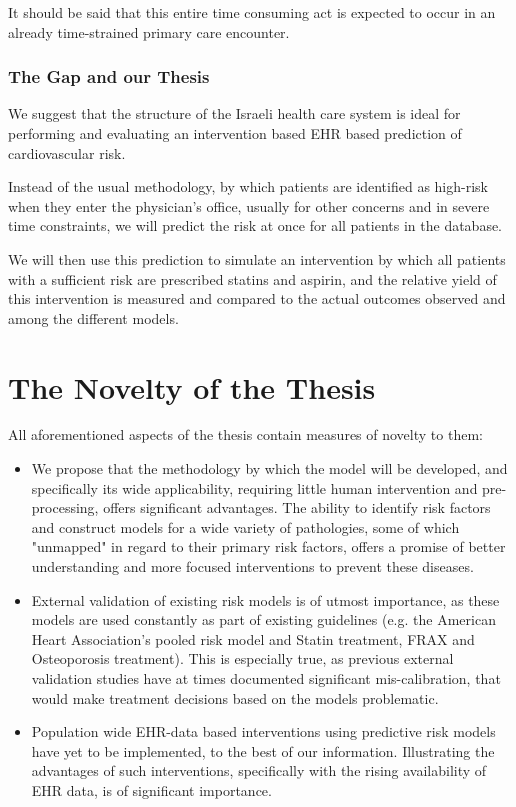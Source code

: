 \documentclass[a4paper,12pt]{article}
\begin{document}
			It should be said that this entire time consuming act is expected to occur in an already time-strained primary care encounter\cite{Konrad2010}.
			
			\subsubsection{The Gap and our Thesis}
			
			We suggest that the structure of the Israeli health care system is ideal for performing and evaluating an intervention based EHR based prediction of cardiovascular risk.
			
			Instead of the usual methodology, by which patients are identified as high-risk when they enter the physician's office, usually for other concerns and in severe time constraints, we will predict the risk at once for all patients in the database.
			
			We will then use this  prediction to simulate an intervention by which all patients with a sufficient risk are prescribed statins and aspirin, and the relative yield of this intervention is measured and compared to the actual outcomes observed and among the different models.
	
	\section{The Novelty of the Thesis}
	
	All aforementioned aspects of the thesis contain measures of novelty to them:
	
	\begin{itemize}
		
		\item We propose that the methodology by which the model will be developed, and specifically its wide applicability, requiring little human intervention and pre-processing, offers significant advantages. The ability to identify risk factors and construct models for a wide variety of pathologies, some of which "unmapped" in regard to their primary risk factors, offers a promise of better understanding and more focused interventions to prevent these diseases.
		
		\item External validation of existing risk models is of utmost importance\cite{Moons2012}, as these models are used constantly as part of existing guidelines (e.g. the American Heart Association's pooled risk model and Statin treatment\cite{Goff2014}, FRAX and Osteoporosis treatment\cite{Kanis2008}). This is especially true, as previous external validation studies have at times documented significant mis-calibration\cite{Bastuji-Garin2002,Dagan2017}, that would make treatment decisions based on the models problematic.
		
		\item Population wide EHR-data based interventions using predictive risk models have yet to be implemented, to the best of our information. Illustrating the advantages of such interventions, specifically with the rising availability of EHR data, is of significant importance.
		
	\end{itemize}
	
\end{document}
